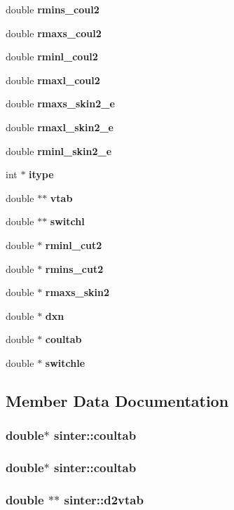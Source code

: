 \begin{CompactItemize}
\item 
double {\bf rmins\_\-coul2}
\item 
double {\bf rmaxs\_\-coul2}
\item 
double {\bf rminl\_\-coul2}
\item 
double {\bf rmaxl\_\-coul2}
\item 
double {\bf rmaxs\_\-skin2\_\-e}
\item 
double {\bf rmaxl\_\-skin2\_\-e}
\item 
double {\bf rminl\_\-skin2\_\-e}
\item 
int $\ast$ {\bf itype}
\item 
double $\ast$$\ast$ {\bf vtab}
\item 
double $\ast$$\ast$ {\bf switchl}
\item 
double $\ast$ {\bf rminl\_\-cut2}
\item 
double $\ast$ {\bf rmins\_\-cut2}
\item 
double $\ast$ {\bf rmaxs\_\-skin2}
\item 
double $\ast$ {\bf dxn}
\item 
double $\ast$ {\bf coultab}
\item 
double $\ast$ {\bf switchle}
\end{CompactItemize}


\subsection{Member Data Documentation}
\subsubsection{\setlength{\rightskip}{0pt plus 5cm}double$\ast$ {\bf sinter::coultab}}\label{structsinter_8f94c3d7bf1876c7a2490b73a1221839}


\subsubsection{\setlength{\rightskip}{0pt plus 5cm}double$\ast$ {\bf sinter::coultab}}\label{structsinter_8f94c3d7bf1876c7a2490b73a1221839}


\subsubsection{\setlength{\rightskip}{0pt plus 5cm}double $\ast$$\ast$ {\bf sinter::d2vtab}}\label{structsinter_f5a35f53fa97bcf139fecaee462361e6}


